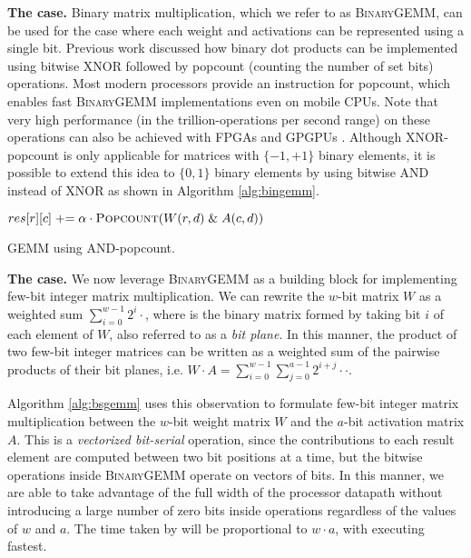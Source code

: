 \documentclass[sigconf]{acmart}
\begin{document}
\label{sec:bingemm}
\textbf{The  case.}
Binary matrix multiplication, which we refer to as \textsc{BinaryGEMM}, can be used for the case where each weight and activations can be represented using a single bit.
Previous work \cite{fptbnn, binarynet, xnornet} discussed how binary dot products can be implemented using bitwise XNOR followed by popcount (counting the number of set bits) operations.
Most modern processors provide an instruction for popcount, which enables fast \textsc{BinaryGEMM} implementations even on mobile CPUs.
Note that very high performance (in the trillion-operations per second range) on these operations can also be achieved with FPGAs \cite{finn,fptbnn} and GPGPUs \cite{binarynet}.
Although XNOR-popcount is only applicable for matrices with $\{-1, +1\}$ binary elements, it is possible to extend this idea to $\{0, 1\}$ binary elements by using bitwise AND instead of XNOR as shown in Algorithm \ref{alg:bingemm}.


\begin{algorithm}[t]
	\centering
	\footnotesize
	\begin{algorithmic}
		\algrenewcommand\algorithmicindent{1.0em}%
					\State $res[r][c] \pluseq \alpha \cdot \Call{Popcount}{W(r, d) \mathrel{\&} A(c, d)} $
				\EndFor
			\EndFor
		\EndFor

		\EndFunction
	\end{algorithmic}
	\caption{ GEMM using AND-popcount.}
	\label{alg:bingemm}
\end{algorithm}

\textbf{The  case.}
\label{sec:bsgemm}
We now leverage \textsc{BinaryGEMM} as a building block for implementing few-bit integer matrix multiplication.
We can rewrite the $w$-bit matrix $W$ as a weighted sum $\sum_{i=0}^{w-1} 2^i \cdot$, where  is the binary matrix formed by taking bit $i$ of each element of $W$, also referred to as a \emph{bit plane}.
In this manner, the product of two few-bit integer matrices can be written as a weighted sum of the pairwise products of their bit planes, i.e. $W \cdot A = \sum_{i=0}^{w-1} \sum_{j=0}^{a-1} 2^{i+j} \cdot$$\cdot$.

Algorithm \ref{alg:bsgemm} uses this observation to formulate few-bit integer matrix multiplication between the $w$-bit weight matrix $W$ and the $a$-bit activation matrix $A$.
This is a \emph{vectorized bit-serial} operation, since the contributions to each result element are computed between two bit positions at a time, but the bitwise operations inside \textsc{BinaryGEMM} operate on vectors of bits.
In this manner, we are able to take advantage of the full width of the processor datapath without introducing a large number of zero bits inside operations regardless of the values of $w$ and $a$.
The time taken by \ours{} will be proportional to $w \cdot a$, with  executing fastest.
\end{document}
